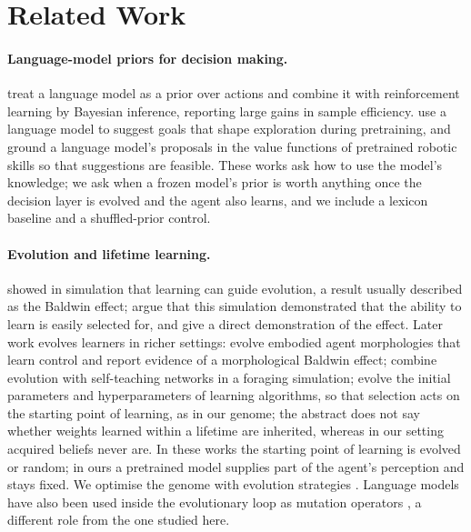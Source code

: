 \documentclass[11pt]{article}
\begin{document}
\section{Related Work}
\paragraph{Language-model priors for decision making.} \citet{yan2025efficient} treat a language model as a prior over actions and combine it with reinforcement learning by Bayesian inference, reporting large gains in sample efficiency. \citet{du2023guiding} use a language model to suggest goals that shape exploration during pretraining, and \citet{ahn2022saycan} ground a language model's proposals in the value functions of pretrained robotic skills so that suggestions are feasible. These works ask how to use the model's knowledge; we ask when a frozen model's prior is worth anything once the decision layer is evolved and the agent also learns, and we include a lexicon baseline and a shuffled-prior control.

\paragraph{Evolution and lifetime learning.} \citet{hinton1987learning} showed in simulation that learning can guide evolution, a result usually described as the Baldwin effect; \citet{fontanari2017revival} argue that this simulation demonstrated that the ability to learn is easily selected for, and give a direct demonstration of the effect. Later work evolves learners in richer settings: \citet{gupta2021embodied} evolve embodied agent morphologies that learn control and report evidence of a morphological Baldwin effect; \citet{le2019evolving} combine evolution with self-teaching networks in a foraging simulation; \citet{fernando2018meta} evolve the initial parameters and hyperparameters of learning algorithms, so that selection acts on the starting point of learning, as in our genome; the abstract does not say whether weights learned within a lifetime are inherited, whereas in our setting acquired beliefs never are. In these works the starting point of learning is evolved or random; in ours a pretrained model supplies part of the agent's perception and stays fixed. We optimise the genome with evolution strategies \citep{salimans2017evolution}. Language models have also been used inside the evolutionary loop as mutation operators \citep{lehman2022evolution}, a different role from the one studied here.
\end{document}
